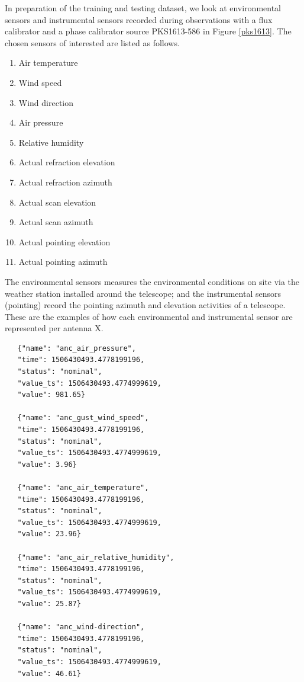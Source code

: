 In preparation of the training and testing dataset, we look at environmental sensors and instrumental sensors
recorded during observations with a flux calibrator and a phase calibrator source
PKS1613-586 in Figure \ref{pks1613}. The chosen sensors of interested are listed as follows. 
\begin{enumerate}

\item Air temperature
\item Wind speed
\item Wind direction 
\item Air pressure 
\item Relative humidity 
\item Actual refraction elevation
\item Actual refraction azimuth
\item Actual scan elevation
\item Actual scan azimuth 
\item Actual pointing elevation
\item Actual pointing azimuth 
\end{enumerate}
The environmental sensors measures the environmental conditions on site via the weather station installed around the telescope; and the instrumental sensors (pointing) record the pointing azimuth and elevation activities of a telescope. These are the examples of how each environmental and instrumental sensor are represented per antenna X.

 
\begin{tcolorbox}
\begin{lstlisting}
   {"name": "anc_air_pressure",
   "time": 1506430493.4778199196,
   "status": "nominal",
   "value_ts": 1506430493.4774999619,
   "value": 981.65}
   
   {"name": "anc_gust_wind_speed",
   "time": 1506430493.4778199196,
   "status": "nominal",
   "value_ts": 1506430493.4774999619,
   "value": 3.96}

   {"name": "anc_air_temperature",
   "time": 1506430493.4778199196,
   "status": "nominal",
   "value_ts": 1506430493.4774999619,
   "value": 23.96}

   {"name": "anc_air_relative_humidity",
   "time": 1506430493.4778199196,
   "status": "nominal",
   "value_ts": 1506430493.4774999619,
   "value": 25.87}

   {"name": "anc_wind-direction",
   "time": 1506430493.4778199196,
   "status": "nominal",
   "value_ts": 1506430493.4774999619,
   "value": 46.61}
  
\end{lstlisting}
\end{tcolorbox}


